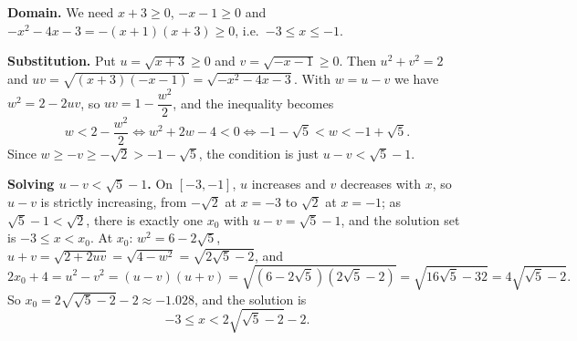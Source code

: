\textbf{Domain.} We need $x+3\ge0$, $-x-1\ge0$ and $-x^2-4x-3=-(x+1)(x+3)\ge0$, i.e.\ $-3\le x\le-1$.

\textbf{Substitution.} Put $u=\sqrt{x+3}\ge0$ and $v=\sqrt{-x-1}\ge0$. Then $u^2+v^2=2$ and $uv=\sqrt{(x+3)(-x-1)}=\sqrt{-x^2-4x-3}$. With $w=u-v$ we have $w^2=2-2uv$, so $uv=1-\dfrac{w^2}{2}$, and the inequality becomes
\[
w<2-\dfrac{w^2}{2}\iff w^2+2w-4<0\iff -1-\sqrt5<w<-1+\sqrt5 .
\]
Since $w\ge-v\ge-\sqrt2>-1-\sqrt5$, the condition is just $u-v<\sqrt5-1$.

\textbf{Solving $u-v<\sqrt5-1$.} On $[-3,-1]$, $u$ increases and $v$ decreases with $x$, so $u-v$ is strictly increasing, from $-\sqrt2$ at $x=-3$ to $\sqrt2$ at $x=-1$; as $\sqrt5-1<\sqrt2$, there is exactly one $x_0$ with $u-v=\sqrt5-1$, and the solution set is $-3\le x<x_0$. At $x_0$: $w^2=6-2\sqrt5$, $u+v=\sqrt{2+2uv}=\sqrt{4-w^2}=\sqrt{2\sqrt5-2}$, and
\[
2x_0+4=u^2-v^2=(u-v)(u+v)=\sqrt{(6-2\sqrt5)(2\sqrt5-2)}=\sqrt{16\sqrt5-32}=4\sqrt{\sqrt5-2}.
\]
So $x_0=2\sqrt{\sqrt5-2}-2\approx-1.028$, and the solution is
\[
\boxed{-3\le x<2\sqrt{\sqrt5-2}-2}.
\]

